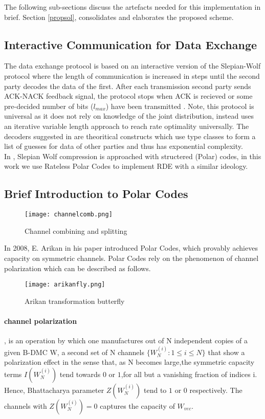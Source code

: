 \documentclass[
11pt, %
a4paper, %
oneside, %
headinclude,footinclude, %
BCOR5mm, %
]{scrartcl}
\begin{document}
The following sub-sections discuss the artefacts needed for this implementation in brief. Section \ref{propsol}, consolidates and elaborates the proposed scheme. 

\subsection{Interactive Communication for Data Exchange}
The data exchange protocol is based on an interactive version of the Slepian-Wolf protocol where the length of communication is increased in steps until the second party decodes the data of the first. After each transmission second party sends ACK-NACK feedback signal, the protocol stops when ACK is recieved or some pre-decided number of bits ($l_{max}$) have been transmitted \cite{htsw}. Note, this protocol is universal as it does not rely on knowledge of the joint distribution, instead uses an iterative variable length approach to reach rate optimality universally. The decoders suggested in \cite{htsw} are theoritical constructs which use type classes to form a list of guesses for data of other parties and thus has exponential complexity.\\ In \cite{pslep}, Slepian Wolf compression is approached with structered (Polar) codes, in this work we use Rateless Polar Codes to implement RDE with a similar ideology.

\subsection{Brief Introduction to Polar Codes}
\begin{wrapfigure}{r}{0.5\textwidth}
  \begin{center}
    \texttt{[image: channelcomb.png]}
  \end{center}
  \caption{Channel combining and splitting}
  \label{fig:channelcomb}
\end{wrapfigure}
In 2008, E. Arikan in his paper \cite{arikan} introduced Polar Codes, which provably achieves capacity on symmetric channels. Polar Codes rely on the phenomenon of channel polarization which can be described as follows.
\begin{wrapfigure}{r}{0.5\textwidth}
  \begin{center}
    \texttt{[image: arikanfly.png]}
  \end{center}
  \caption{Arikan transformation butterfly}
  \label{fig:arikanfly}
\end{wrapfigure}
\paragraph{channel polarization}, is an operation by which one manufactures out of N independent copies of a given B-DMC W, a second set of N channels $\{W^{(i)}_N : 1 \leq i \leq N \}$ that show a polarization effect in the sense that, as N becomes large,the symmetric capacity terms $I(W^{(i)}_N )$ tend towards $0$ or $1$,for all but a vanishing fraction of indices i. Hence, Bhattacharya parameter $Z(W^{(i)}_N)$ tend to $1$ or $0$ respectively. The channels with $Z(W^{(i)}_N)=0$ captures the capacity of $W_{vec}$.
\end{document}
